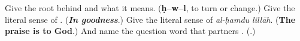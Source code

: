 \begin{tcolorbox}[breakable,colback=teal!4,colframe=teal!35!black,title={Before you move on}]
Give the root behind \textbf{} and what it means. (\textbf{ḥ–w–l}, to turn or change.) Give the literal sense of \textbf{}. (\emph{\textbf{In goodness}}.) Give the literal sense of \emph{al-ḥamdu lillāh}. (\textbf{The praise is to God}.) And name the question word that partners \textbf{}. (\textbf{}.)
\end{tcolorbox}
